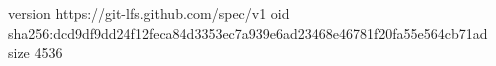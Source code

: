 version https://git-lfs.github.com/spec/v1
oid sha256:dcd9df9dd24f12feca84d3353ec7a939e6ad23468e46781f20fa55e564cb71ad
size 4536
